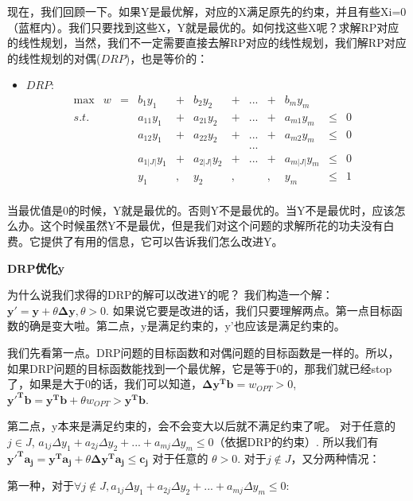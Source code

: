 \documentclass[11pt]{article}
\begin{document}
\begin{CJK}{UTF8}{gbsn}
现在，我们回顾一下。如果Y是最优解，对应的X满足原先的约束，并且有些Xi=0（蓝框内）。我们只要找到这些X，Y就是最优的。如何找这些X呢？求解RP对应的线性规划，当然，我们不一定需要直接去解RP对应的线性规划，我们解RP对应的线性规划的对偶($DRP$)，也是等价的：
\begin{itemize}
\item $DRP$:
\[
\begin{array}{rrrrrrrrrrrrrrrrrrrrl}
\max & w &=& b_1y_1    &+&  b_2y_2   &+&  ...&+& b_my_m    &      &    & \\
 s.t. & & & a_{11}y_1 &+& a_{21}y_2 &+& ... &+& a_{m1}y_m & \leq & 0 &  \\
      & & & a_{12}y_1 &+& a_{22}y_2 &+& ... &+& a_{m2}y_m & \leq & 0 &  \\
      & & &          & &           & & ... & &           &      &     &  \\
      & & & a_{1|J|}y_1 &+& a_{2|J|}y_2 &+& ... &+& a_{m|J|}y_m & \leq & 0 & \\
      & & &      y_1 &,&       y_2 &,&     &,&       y_m & \leq & 1   & \\
     \end{array} \nonumber
\]
\end{itemize}
当最优值是0的时候，Y就是最优的。否则Y不是最优的。当Y不是最优时，应该怎么办。这个时候虽然Y不是最优，但是我们对这个问题的求解所花的功夫没有白费。它提供了有用的信息，它可以告诉我们怎么改进Y。


\textbf{DRP优化y}

为什么说我们求得的DRP的解可以改进Y的呢？
我们构造一个解：$\mathbf{y' = y +} \theta \mathbf{ \Delta y}, \theta > 0 $.
如果说它要是改进的话，我们只要理解两点。第一点目标函数的确是变大啦。第二点，y是满足约束的，y'也应该是满足约束的。

我们先看第一点。DRP问题的目标函数和对偶问题的目标函数是一样的。所以，如果DRP问题的目标函数能找到一个最优解，它是等于0的，那我们就已经stop了，如果是大于0的话，我们可以知道，$\mathbf{\Delta y^T b } = w_{OPT}  > 0$,  $\mathbf{y'^T b = y^T b } + \theta w_{OPT}  > \mathbf{ y^T b}$.

第二点，y本来是满足约束的，会不会变大以后就不满足约束了呢。
对于任意的$ j \in J$,  $a_{1j} \Delta y_1 + a_{2j}\Delta y_2 + ... + a_{mj}\Delta y_m  \leq  0$（依据DRP的约束）. 所以我们有 $\mathbf{y'^Ta_j} = \mathbf{y^Ta_j} + \theta \mathbf{\Delta y^Ta_j} \leq \mathbf{c_j}$ 对于任意的 $\theta > 0$.
对于$j \notin J$，又分两种情况：

第一种，对于$\forall j \notin J, a_{1j} \Delta y_1 + a_{2j}\Delta y_2 + ... + a_{mj}\Delta y_m  \leq  0$:


\end{CJK}
\end{document}

